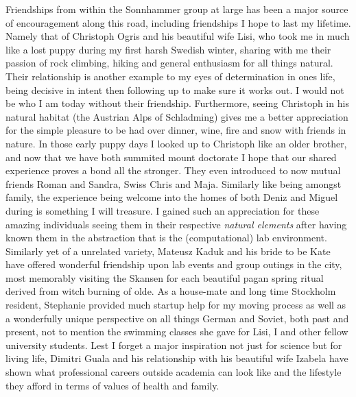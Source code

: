 Friendships from within the Sonnhammer group at large has been a major source of encouragement along this road, including friendships I hope to last my lifetime. Namely that of Christoph Ogris and his beautiful wife Lisi, who took me in much like a lost puppy during my first harsh Swedish winter, sharing with me their passion of rock climbing, hiking and general enthusiasm for all things natural. Their relationship is another example to my eyes of determination in ones life, being decisive in intent then following up to make sure it works out. I would not be who I am today without their friendship. Furthermore, seeing Christoph in his natural habitat (the Austrian Alps of Schladming) gives me a better appreciation for the simple pleasure to be had over dinner, wine, fire and snow with friends in nature. In those early puppy days I looked up to Christoph like an older brother, and now that we have both summited mount doctorate I hope that our shared experience proves a bond all the stronger. They even introduced to now mutual friends Roman and Sandra, Swiss Chris and Maja. Similarly like being amongst family, the experience being welcome into the homes of both Deniz and Miguel during is something I will treasure. I gained such an appreciation for these amazing individuals seeing them in their respective \emph{natural elements} after having known them in the abstraction that is the (computational) lab environment. Similarly yet of a unrelated variety, Mateusz Kaduk and his bride to be Kate have offered wonderful friendship upon lab events and group outings in the city, most memorably visiting the Skansen for each beautiful pagan spring ritual derived from witch burning of olde. As a house-mate and long time Stockholm resident, Stephanie provided much startup help for my moving process as well as a wonderfully unique perspective on all things German and Soviet, both past and present, not to mention the swimming classes she gave for Lisi, I and other fellow university students. Lest I forget a major inspiration not just for science but for living life, Dimitri Guala and his relationship with his beautiful wife Izabela have shown what professional careers outside academia can look like and the lifestyle they afford in terms of values of health and family. 

